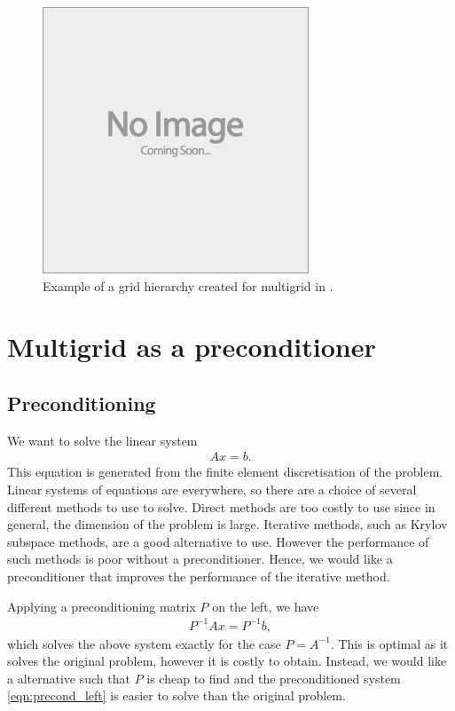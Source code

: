 \begin{figure}[h]
	\centering
	\includegraphics[draft]{images/placeholder}
	\caption{Example of a grid hierarchy created for multigrid in \oomph.}
\end{figure}






\section{Multigrid as a preconditioner}
\label{sec:precond}

\subsection{Preconditioning}

We want to solve the linear system
\begin{align}
	A x = b.
\end{align}
This equation is generated from the finite element discretisation of the problem.
Linear systems of equations are everywhere, so there are a choice of several different methods to use to solve.
Direct methods are too costly to use since in general, the dimension of the problem is large.
Iterative methods, such as Krylov subspace methods, are a good alternative to use.
However the performance of such methods is poor without a preconditioner.
Hence, we would like a preconditioner that improves the performance of the iterative method.

Applying a preconditioning matrix $P$ on the left, we have
\begin{align}
	P^{-1} A x = P^{-1} b, \label{eqn:precond_left}
\end{align}
which solves the above system exactly for the case $P=A^{-1}$. 
This is optimal as it solves the original problem, however it is costly to obtain.
Instead, we would like a alternative such that $P$ is cheap to find and the preconditioned system \eqref{eqn:precond_left} is easier to solve than the original problem.

